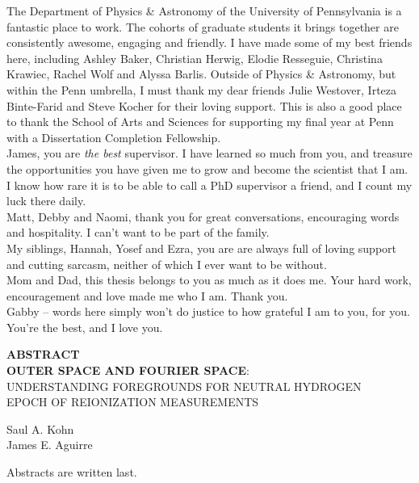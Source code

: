 \documentclass[12pt,twoside,openany]{book}
\newcommand{\tita}{{\bf OUTER SPACE AND FOURIER SPACE}:\\UNDERSTANDING FOREGROUNDS FOR NEUTRAL HYDROGEN\\EPOCH OF REIONIZATION MEASUREMENTS}
\begin{document}
\noindent
The Department of Physics \& Astronomy of the University of Pennsylvania is a fantastic place to work. The cohorts of graduate students it brings together are consistently awesome, engaging and friendly. I have made some of my best friends here, including Ashley Baker, Christian Herwig, Elodie Resseguie, Christina Krawiec, Rachel Wolf and Alyssa Barlis. Outside of Physics \& Astronomy, but within the Penn umbrella, I must thank my dear friends Julie Westover, Irteza Binte-Farid and Steve Kocher for their loving support. This is also a good place to thank the School of Arts and Sciences for supporting my final year at Penn with a Dissertation Completion Fellowship.\\

\noindent
James, you are \textit{the best} supervisor. I have learned so much from you, and treasure the opportunities you have given me to grow and become the scientist that I am. I know how rare it is to be able to call a PhD supervisor a friend, and I count my luck there daily.\\

\noindent
Matt, Debby and Naomi, thank you for great conversations, encouraging words and hospitality. I can't want to be part of the family.\\

\noindent
My siblings, Hannah, Yosef and Ezra, you are are always full of loving support and cutting sarcasm, neither of which I ever want to be without.\\

\noindent
Mom and Dad, this thesis belongs to you as much as it does me. Your hard work, encouragement and love made me who I am. Thank you.\\

\noindent
Gabby -- words here simply won't do justice to how grateful I am to you, for you. You're the best, and I love you.



\newpage
\vspace*{.15 in}
\begin{center}
{\bf ABSTRACT}\\
\tita \\
\parskip=0.2in


Saul A. Kohn\\
James E. Aguirre
\end{center}
\noindent
Abstracts are written last.
\end{document}
